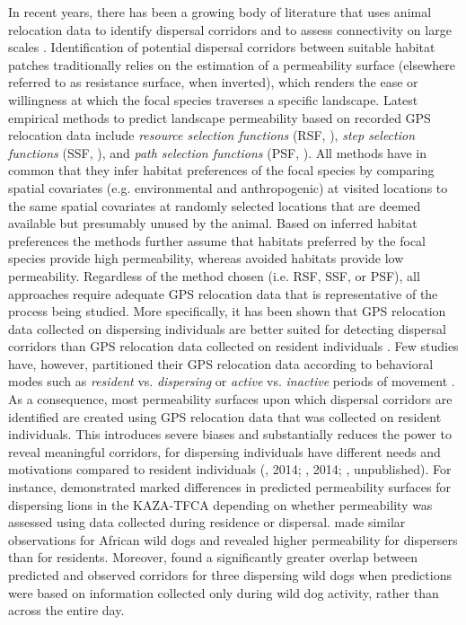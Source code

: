 \documentclass[abstract=on,10pt,a4paper,bibliography=totocnumbered]{scrartcl}
\begin{document}
In recent years, there has been a growing body of literature that uses animal
relocation data to identify dispersal corridors and to assess connectivity on
large scales \citep{Chetkiewicz.2006}. Identification of potential dispersal
corridors between suitable habitat patches traditionally relies on the
estimation of a permeability surface (elsewhere referred to as resistance
surface, when inverted), which renders the ease or willingness at which the
focal species traverses a specific landscape. Latest empirical methods to
predict landscape permeability based on recorded GPS relocation data include
\textit{resource selection functions} (RSF, \citealp{Boyce.2002}), \textit{step
selection functions} (SSF, \citealp{Fortin.2005}), and \textit{path selection
functions} (PSF, \citealp{Cushman.2010}). All methods have in common that they
infer habitat preferences of the focal species by comparing spatial covariates
(e.g. environmental and anthropogenic) at visited locations to the same spatial
covariates at randomly selected locations that are deemed available but
presumably unused by the animal. Based on inferred habitat preferences the
methods further assume that habitats preferred by the focal species provide high
permeability, whereas avoided habitats provide low permeability. Regardless of
the method chosen (i.e. RSF, SSF, or PSF), all approaches require adequate GPS
relocation data that is representative of the process being studied. More
specifically, it has been shown that GPS relocation data collected on dispersing
individuals are better suited for detecting dispersal corridors than GPS
relocation data collected on resident individuals \citep{Elliot.2014}. Few
studies have, however, partitioned their GPS relocation data according to
behavioral modes such as \textit{resident} vs. \textit{dispersing} or
\textit{active} vs. \textit{inactive} periods of movement \citep{Wilson.2012,
Vasudev.2015}. As a consequence, most permeability surfaces upon which dispersal
corridors are identified are created using GPS relocation data that was
collected on resident individuals. This introduces severe biases and
substantially reduces the power to reveal meaningful corridors, for dispersing
individuals have different needs and motivations compared to resident
individuals (\citeauthor{Killeen.2014}, 2014; \citeauthor{Elliot.2014}, 2014;
\citeauthor{Cozzi.2020}, unpublished). For instance, \cite{Elliot.2014}
demonstrated marked differences in predicted permeability surfaces for
dispersing lions in the KAZA-TFCA depending on whether permeability was assessed
using data collected during residence or dispersal. \cite{Jackson.2016} made
similar observations for African wild dogs and revealed higher permeability for
dispersers than for residents. Moreover, \cite{Abrahms.2017} found a
significantly greater overlap between predicted and observed corridors for three
dispersing wild dogs when predictions were based on information collected only
during wild dog activity, rather than across the entire day.
\end{document}
